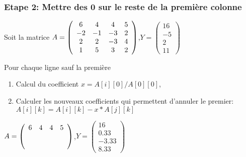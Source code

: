 \begin{frame}[fragile]
\frametitle{Etape 2: Mettre des 0 sur le reste de la première colonne}

Soit la matrice $A=\left(\begin{array}{c c c c}
6 & 4 & 4 & 5 \\
-2 & -1 & -3 & 2 \\
2 & 2 & -3 & 4 \\
1 & 5 & 3 & 2
\end{array}\right)$,$Y=\left(\begin{array}{c}
16 \\
-5 \\
2 \\
11
\end{array}\right)$

Pour chaque ligne sauf la première
\begin{enumerate}
 \item Calcul du coefficient $x=A[i][0]/A[0][0]$,
 \item Calculer les nouveaux coefficients qui permettent d'annuler le premier:  $A[i][k] = A[i][k] - x*A[j][k]$
\end{enumerate}

$A=\left(\begin{array}{c c c c}
6 & 4 & 4 & 5 \\
\ifdef{\public}{\uncover<2->{0 & 0.33 & -1.66 & 3.66\\}}{ \\}
\ifdef{\public}{\uncover<2->{0 & 0.66 & -4.33 & 2.33\\}}{ \\}
\ifdef{\public}{\uncover<2->{0 & 4.33 & 2.33 & 1.16}}{}
\end{array}\right)$,$Y=\left(\begin{array}{c}
16 \\
0.33 \\
-3.33 \\
8.33
\end{array}\right)$
\end{frame}

